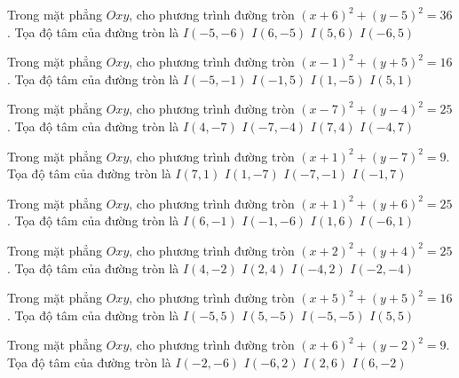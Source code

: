 \begin{ex}
Trong mặt phẳng $Oxy$, cho phương trình đường tròn $(x + 6)^2  + (y -5)^2 = 36$. Tọa độ tâm của đường tròn là
\choice
{ $I(-5, -6)$ }
{ $I(6, -5)$ }
{ $I(5, 6)$ }
{ \True $I(-6, 5)$ }
\end{ex}

\begin{ex}
Trong mặt phẳng $Oxy$, cho phương trình đường tròn $(x -1)^2   + (y + 5)^2 = 16$. Tọa độ tâm của đường tròn là
\choice
{ $I(-5, -1)$ }
{ $I(-1, 5)$ }
{ \True $I(1, -5)$ }
{ $I(5, 1)$ }
\end{ex}

\begin{ex}
Trong mặt phẳng $Oxy$, cho phương trình đường tròn $(x -7)^2   + (y -4)^2 = 25$. Tọa độ tâm của đường tròn là
\choice
{ $I(4, -7)$ }
{ $I(-7, -4)$ }
{ \True $I(7, 4)$ }
{ $I(-4, 7)$ }
\end{ex}

\begin{ex}
Trong mặt phẳng $Oxy$, cho phương trình đường tròn $(x + 1)^2  + (y -7)^2 = 9$. Tọa độ tâm của đường tròn là
\choice
{ $I(7, 1)$ }
{ $I(1, -7)$ }
{ $I(-7, -1)$ }
{ \True $I(-1, 7)$ }
\end{ex}

\begin{ex}
Trong mặt phẳng $Oxy$, cho phương trình đường tròn $(x + 1)^2  + (y + 6)^2 = 25$. Tọa độ tâm của đường tròn là
\choice
{ $I(6, -1)$ }
{ \True $I(-1, -6)$ }
{ $I(1, 6)$ }
{ $I(-6, 1)$ }
\end{ex}

\begin{ex}
Trong mặt phẳng $Oxy$, cho phương trình đường tròn $(x + 2)^2  + (y + 4)^2 = 25$. Tọa độ tâm của đường tròn là
\choice
{ $I(4, -2)$ }
{ $I(2, 4)$ }
{ $I(-4, 2)$ }
{ \True $I(-2, -4)$ }
\end{ex}

\begin{ex}
Trong mặt phẳng $Oxy$, cho phương trình đường tròn $(x + 5)^2  + (y + 5)^2 = 16$. Tọa độ tâm của đường tròn là
\choice
{ $I(-5, 5)$ }
{ $I(5, -5)$ }
{ \True $I(-5, -5)$ }
{ $I(5, 5)$ }
\end{ex}

\begin{ex}
Trong mặt phẳng $Oxy$, cho phương trình đường tròn $(x + 6)^2  + (y -2)^2 = 9$. Tọa độ tâm của đường tròn là
\choice
{ $I(-2, -6)$ }
{ \True $I(-6, 2)$ }
{ $I(2, 6)$ }
{ $I(6, -2)$ }
\end{ex}

